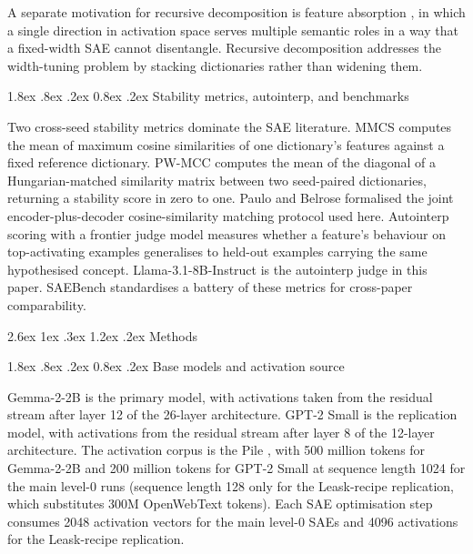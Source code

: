 \documentclass[conference]{IEEEtran}
\makeatletter
\renewcommand\section{\@startsection{section}{1}{\z@}%
   {2.6ex \@plus 1ex \@minus .3ex}%
   {1.2ex \@plus .2ex}%
   {\normalfont\Large\bfseries\centering}}
\renewcommand\subsection{\@startsection{subsection}{2}{\z@}%
   {1.8ex \@plus .8ex \@minus .2ex}%
   {0.8ex \@plus .2ex}%
   {\normalfont\large\bfseries}}
\makeatother
\begin{document}
A separate motivation for recursive decomposition is feature absorption
\autocite{chanin2024absorption}, in which a single direction in
activation space serves multiple semantic roles in a way that a
fixed-width SAE cannot disentangle. Recursive decomposition addresses
the width-tuning problem by stacking dictionaries rather than widening
them.

\hypertarget{d.-stability-metrics-autointerp-and-benchmarks}{%
\subsection{Stability metrics, autointerp, and
benchmarks}\label{d.-stability-metrics-autointerp-and-benchmarks}}

Two cross-seed stability metrics dominate the SAE literature. MMCS
\autocite{sharkey2022taking} computes the mean of maximum cosine
similarities of one dictionary's features against a fixed reference
dictionary. PW-MCC \autocite{song2025position} computes the mean of the
diagonal of a Hungarian-matched similarity matrix between two
seed-paired dictionaries, returning a stability score in zero to one.
Paulo and Belrose \autocite{paulo2025sparse} formalised the joint
encoder-plus-decoder cosine-similarity matching protocol used here.
Autointerp scoring with a frontier judge model
\autocite{paulo2024autointerp} measures whether a feature's behaviour on
top-activating examples generalises to held-out examples carrying the
same hypothesised concept. Llama-3.1-8B-Instruct
\autocite{dubey2024llama} is the autointerp judge in this paper.
SAEBench \autocite{karvonen2025saebench} standardises a battery of these
metrics for cross-paper comparability.

\hypertarget{methods}{%
\section{Methods}\label{methods}}

\hypertarget{a.-base-models-and-activation-source}{%
\subsection{Base models and activation
source}\label{a.-base-models-and-activation-source}}

Gemma-2-2B \autocite{gemmateam2024gemma} is the primary model, with
activations taken from the residual stream after layer 12 of the
26-layer architecture. GPT-2 Small \autocite{radford2019language} is the
replication model, with activations from the residual stream after layer
8 of the 12-layer architecture. The activation corpus is the Pile
\autocite{gao2020pile}, with 500 million tokens for Gemma-2-2B and 200
million tokens for GPT-2 Small at sequence length 1024 for the main
level-0 runs (sequence length 128 only for the Leask-recipe replication,
which substitutes 300M OpenWebText tokens). Each SAE optimisation step
consumes 2048 activation vectors for the main level-0 SAEs and 4096
activations for the Leask-recipe replication.
\end{document}
